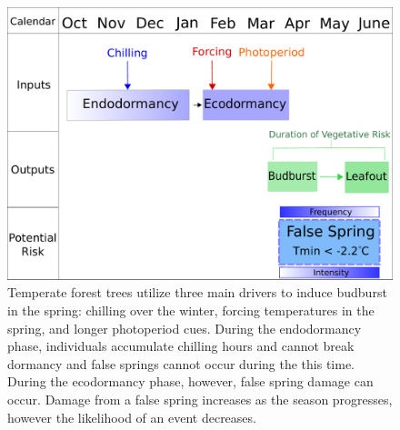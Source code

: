 \documentclass{article}\usepackage[]{graphicx}\usepackage[]{color}
\begin{document}
\begin{figure} [H] 
\begin{center}
\includegraphics{..//figure/CuesAndFS.pdf}
\caption{Temperate forest trees utilize three main drivers to induce budburst in the spring: chilling over the winter, forcing temperatures in the spring, and longer photoperiod cues. During the endodormancy phase, individuals accumulate chilling hours and cannot break dormancy and false springs cannot occur during the this time. During the ecodormancy phase, however, false spring damage can occur. Damage from a false spring increases as the season progresses, however the likelihood of an event decreases.}\label{fig:cues}
\end{center}
\end{figure}
\end{document}

